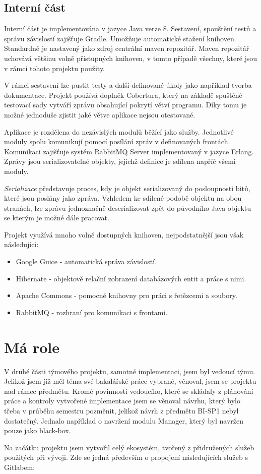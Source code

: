 \documentclass[thesis=B,czech]{FITthesis}[2012/06/26]
\begin{document}
\subsection{Interní část}
Interní část je implementována v jazyce Java verze 8. Sestavení, spouštění testů a správu závislostí zajišťuje Gradle\cite{gradle}.
Umožňuje automatické stažení knihoven. Standardně je nastavený jako zdroj
centrální maven repozitář.\cite{mavenRepo} Maven repozitář uchovává většinu volně přístupných knihoven, v tomto případě všechny, které jsou v rámci tohoto projektu použity.
\par
V rámci sestavení lze pustit testy a další definované úkoly jako například tvorba dokumentace. Projekt používá
doplněk Cobertura\cite{cobertura}, který na základě spuštěné testovací sady vytváří zprávu obsahující pokrytí větví programu.
Díky tomu je možné jednoduše zjistit jaké větve aplikace nejsou otestované.
\par
Aplikace je rozdělena do nezávislých modulů běžící jako služby. Jednotlivé moduly spolu komunikují
pomocí posílání zpráv v definovaných frontách. Komunikaci zajišťuje systém RabbitMQ Server\cite{rabbitMQ} implementovaný v jazyce Erlang. Zprávy jsou serializovatelné objekty, jejichž definice je sdílena napříč všemi moduly.
\par
\textit{Serializace} představuje proces, kdy je objekt serializovaný do posloupnosti bitů, které jsou poslány jako zpráva. 
Vzhledem ke sdílené podobě objektu na obou stranách, lze zprávu jednoznačně deserializovat zpět do původního Java objektu se kterým
je možné dále pracovat.\cite{serialization}
\par
Projekt využívá mnoho volně dostupných knihoven, nejpodstatnější jsou však následující:
\begin{itemize}
\item Google Guice - automatická správa závislostí.\cite{guice}
\item Hibernate - objektově relační zobrazení databázových entit a práce s nimi.\cite{hibernate}
\item Apache Commons - pomocné knihovny pro práci s řetězcemi a soubory.\cite{commons}
\item RabbitMQ - rozhraní pro komunikaci s frontami.\cite{rabbitMQ}
\end{itemize}

\section{Má role}
V druhé části týmového projektu, samotné implementaci, jsem byl vedoucí týmu. Jelikož jsem již měl téma své bakalářské práce vybrané, 
věnoval, jsem se projektu nad rámec předmětu. Kromě povinností vedoucího, které se skládaly z plánování práce a kontroly vytvořené implementace
jsem se věnoval návrhu, který bylo třeba v průběhu semestru pozměnit, jelikož návrh z předmětu BI-SP1 nebyl dostatečný. Jednalo například
o navržení modulu Manager, který byl navržen pouze jako black-box.
\par
Na začátku projektu jsem vytvořil celý ekosystém, tvořený z přidružených služeb použitých při vývoji.
Zde se jedná především o propojení následujících služeb s Gitlabem:
\end{document}
